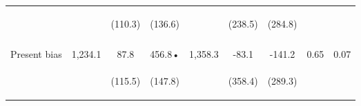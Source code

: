 \begin{tabular}{lcccccccc}
 & \begin{footnotesize}\end{footnotesize} & \begin{footnotesize}(110.3)\end{footnotesize} & \begin{footnotesize}(136.6)\end{footnotesize} & \begin{footnotesize}\end{footnotesize} & \begin{footnotesize}(238.5)\end{footnotesize} & \begin{footnotesize}(284.8)\end{footnotesize} & \begin{footnotesize}\end{footnotesize} & \begin{footnotesize}\end{footnotesize}\\
 & \begin{footnotesize}\end{footnotesize} & \begin{footnotesize}[1.000]\end{footnotesize} & \begin{footnotesize}[0.036]\end{footnotesize} & \begin{footnotesize}\end{footnotesize} & \begin{footnotesize}[1.000]\end{footnotesize} & \begin{footnotesize}[0.527]\end{footnotesize} & \begin{footnotesize}\end{footnotesize} & \begin{footnotesize}\end{footnotesize}\\
\noalign{\smallskip}Present bias & 1,234.1 & 87.8 & 456.8• & 1,358.3 & -83.1 & -141.2 & 0.65 & 0.07\\
 & \begin{footnotesize}\end{footnotesize} & \begin{footnotesize}(115.5)\end{footnotesize} & \begin{footnotesize}(147.8)\end{footnotesize} & \begin{footnotesize}\end{footnotesize} & \begin{footnotesize}(358.4)\end{footnotesize} & \begin{footnotesize}(289.3)\end{footnotesize} & \begin{footnotesize}\end{footnotesize} & \begin{footnotesize}\end{footnotesize}\\

\end{tabular}
